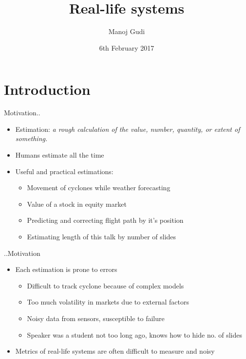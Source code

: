 \documentclass{beamer}
\title[Real-life systems]{Real-life systems}
\author{Manoj Gudi}
\institute{Ex-R.A. FOSSEE | CTO | Focus Analytics}
\date{6th February 2017}
\begin{document}
\begin{frame}
  \titlepage
\end{frame}


\section{Introduction}
\begin{frame}{Motivation..}

\begin{itemize}
  \item Estimation: \textit{a rough calculation of the value, number, quantity, or extent of something.}
  \item Humans estimate all the time
  \item Useful and practical estimations:
  \begin{itemize}
    \item Movement of cyclones while weather forecasting
    \item Value of a stock in equity market
    \item Predicting and correcting flight path by it's position
    \item Estimating length of this talk by number of slides
  \end{itemize}
\end{itemize}
\vskip 1cm
\end{frame}

\begin{frame}{..Motivation}

\begin{itemize}
  \item Each estimation is prone to errors
  \begin{itemize}
    \item Difficult to track cyclone because of complex models
    \item Too much volatility in markets due to external factors
    \item Noisy data from sensors, susceptible to failure
    \item Speaker was a student not too long ago, knows how to hide no. of slides
  \end{itemize}
  \item Metrics of real-life systems are often difficult to measure and noisy
\end{itemize}
\vskip 1cm
\end{frame}
\end{document}
